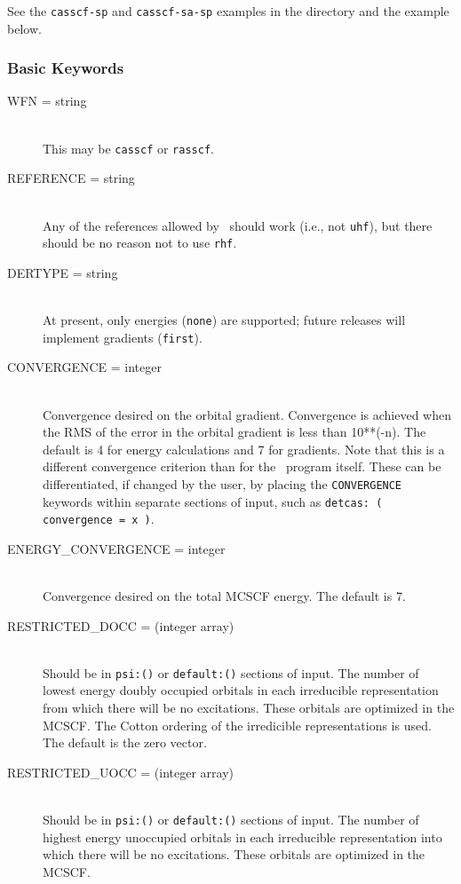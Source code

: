 See the {\tt casscf-sp} and {\tt casscf-sa-sp} examples in the 
 directory and the example below.

\subsubsection{Basic Keywords}
\begin{description}
\item[WFN = string]\mbox{}\\
This may be {\tt casscf} or {\tt rasscf}.
\item[REFERENCE = string]\mbox{}\\
Any of the references allowed by \PSIdetci\ should work (i.e., not 
{\tt uhf}), but there should be no reason not to use {\tt rhf}.
\item[DERTYPE = string]\mbox{}\\
At present, only energies ({\tt none}) are supported; future
releases will implement gradients ({\tt first}).
\item[CONVERGENCE = integer]\mbox{}\\
Convergence desired on the orbital gradient.  Convergence is achieved when
the RMS of the error in the orbital gradient is less than 10**(-n).  The 
default is 4 for energy calculations and 7 for gradients.  Note that
this is a different convergence criterion than for the \PSIdetci\
program itself.  These can be differentiated, if changed by the user,
by placing the {\tt CONVERGENCE} keywords within separate sections of
input, such as {\tt detcas: ( convergence = x )}.
\item[ENERGY\_CONVERGENCE = integer]\mbox{}\\
Convergence desired on the total MCSCF energy.  The default is 7.
\item[RESTRICTED\_DOCC = (integer array)]\mbox{}\\
Should be in {\tt psi:()} or {\tt default:()} sections of input.
The number of lowest energy doubly occupied orbitals in each irreducible
representation from which there will be no excitations.  
These orbitals are optimized in the MCSCF.
The Cotton ordering of the irredicible representations is used.
The default is the zero vector.
\item[RESTRICTED\_UOCC = (integer array)]\mbox{}\\
Should be in {\tt psi:()} or {\tt default:()} sections of input.
The number of highest energy unoccupied orbitals in each irreducible
representation into which there will be no excitations.
These orbitals are optimized in the MCSCF.

\end{description}
